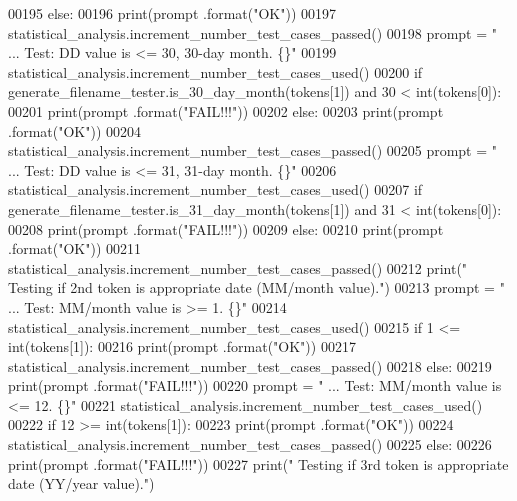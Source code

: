 \begin{DoxyCode}
00195         \textcolor{keywordflow}{else}:
00196             print(prompt .format(\textcolor{stringliteral}{"OK"}))
00197             statistical\_analysis.increment\_number\_test\_cases\_passed()
00198         prompt = \textcolor{stringliteral}{"  ... Test: DD value is <= 30, 30-day month.      \{\}"}
00199         statistical\_analysis.increment\_number\_test\_cases\_used()
00200         \textcolor{keywordflow}{if} generate\_filename\_tester.is\_30\_day\_month(tokens[1]) \textcolor{keywordflow}{and} 30 < int(tokens[0]):
00201             print(prompt .format(\textcolor{stringliteral}{"FAIL!!!"}))
00202         \textcolor{keywordflow}{else}:
00203             print(prompt .format(\textcolor{stringliteral}{"OK"}))
00204             statistical\_analysis.increment\_number\_test\_cases\_passed()
00205         prompt = \textcolor{stringliteral}{"  ... Test: DD value is <= 31, 31-day month.      \{\}"}
00206         statistical\_analysis.increment\_number\_test\_cases\_used()
00207         \textcolor{keywordflow}{if} generate\_filename\_tester.is\_31\_day\_month(tokens[1]) \textcolor{keywordflow}{and} 31 < int(tokens[0]):
00208             print(prompt .format(\textcolor{stringliteral}{"FAIL!!!"}))
00209         \textcolor{keywordflow}{else}:
00210             print(prompt .format(\textcolor{stringliteral}{"OK"}))
00211             statistical\_analysis.increment\_number\_test\_cases\_passed()
00212         print(\textcolor{stringliteral}{" Testing if 2nd token is appropriate date (MM/month value)."})
00213         prompt = \textcolor{stringliteral}{"  ... Test: MM/month value is >= 1.           \{\}"}
00214         statistical\_analysis.increment\_number\_test\_cases\_used()
00215         \textcolor{keywordflow}{if} 1 <= int(tokens[1]):
00216             print(prompt .format(\textcolor{stringliteral}{"OK"}))
00217             statistical\_analysis.increment\_number\_test\_cases\_passed()
00218         \textcolor{keywordflow}{else}:
00219             print(prompt .format(\textcolor{stringliteral}{"FAIL!!!"}))
00220         prompt = \textcolor{stringliteral}{"  ... Test: MM/month value is <= 12.          \{\}"}
00221         statistical\_analysis.increment\_number\_test\_cases\_used()
00222         \textcolor{keywordflow}{if} 12 >= int(tokens[1]):
00223             print(prompt .format(\textcolor{stringliteral}{"OK"}))
00224             statistical\_analysis.increment\_number\_test\_cases\_passed()
00225         \textcolor{keywordflow}{else}:
00226             print(prompt .format(\textcolor{stringliteral}{"FAIL!!!"}))
00227         print(\textcolor{stringliteral}{" Testing if 3rd token is appropriate date (YY/year value)."})

\end{DoxyCode}
